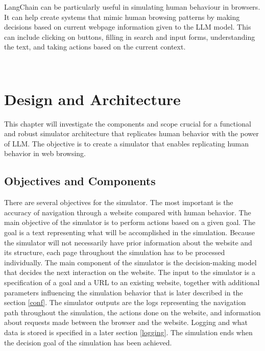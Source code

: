 LangChain can be particularly useful in simulating human behaviour in browsers. It can help create systems that mimic human browsing patterns by making decisions based on current webpage information given to the LLM model. This can include clicking on buttons, filling in search and input forms, understanding the text, and taking actions based on the current context. 








\
% 

\chapter{Design and Architecture}
\label{da}

This chapter will investigate the components and scope crucial for a functional and robust simulator architecture that replicates human behavior with the power of LLM. The objective is to create a simulator that enables replicating human behavior in web browsing.

\section{Objectives and Components}

There are several objectives for the simulator. The most important is the accuracy of navigation through a website compared with human behavior. The main objective of the simulator is to perform actions based on a given goal. The goal is a text representing what will be accomplished in the simulation. Because the simulator will not necessarily have prior information about the website and its structure, each page throughout the simulation has to be processed individually. The main component of the simulator is the decision-making model that decides the next interaction on the website. The input to the simulator is a specification of a goal and a URL to an existing website, together with additional parameters influencing the simulation behavior that is later described in the section \ref{conf}. The simulator outputs are the logs representing the navigation path throughout the simulation, the actions done on the website, and information about requests made between the browser and the website. Logging and what data is stored is specified in a later section \ref{logging}. The simulation ends when the decision goal of the simulation has been achieved.


